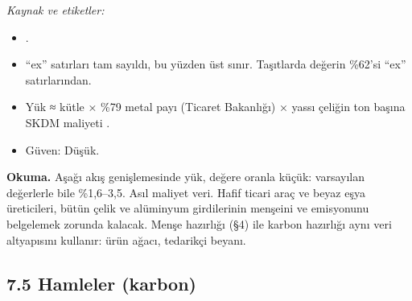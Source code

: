 \endgroup

\emph{Kaynak ve etiketler:}

\begin{itemize}
\tightlist
\item
  \etiketT{} .
\item
  ``ex'' satırları tam sayıldı, bu yüzden üst sınır. Taşıtlarda değerin \%62'si ``ex'' satırlarından.
\item
  Yük ≈ kütle × \%79 metal payı (Ticaret Bakanlığı) × yassı çeliğin ton başına SKDM maliyeti \etiketH{}.
\item
  Güven: Düşük.
\end{itemize}

\textbf{Okuma.} Aşağı akış genişlemesinde yük, değere oranla küçük: varsayılan değerlerle bile \%1,6--3,5. Asıl maliyet veri. Hafif ticari araç ve beyaz eşya üreticileri, bütün çelik ve alüminyum girdilerinin menşeini ve emisyonunu belgelemek zorunda kalacak. Menşe hazırlığı (§4) ile karbon hazırlığı aynı veri altyapısını kullanır: ürün ağacı, tedarikçi beyanı.

\hypertarget{02c_hazirlik-75-hamleler-karbon}{%
\subsection{7.5 Hamleler (karbon)}\label{02c_hazirlik-75-hamleler-karbon}}

\begingroup\gbtablo\small

